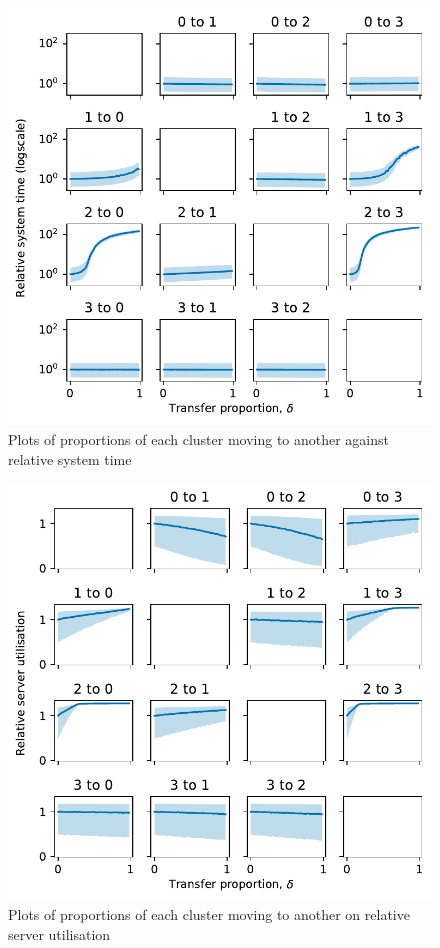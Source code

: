 \begin{figure}
    \centering
    \includegraphics[width=\textwidth]{moving_time}
    \caption{%
        Plots of proportions of each cluster moving to another against relative
        system time
    }\label{fig:moving_time}
\end{figure}

\begin{figure}
    \centering
    \includegraphics[width=\textwidth]{moving_util}
    \caption{%
        Plots of proportions of each cluster moving to another on relative
        server utilisation
    }\label{fig:moving_util}
\end{figure}

